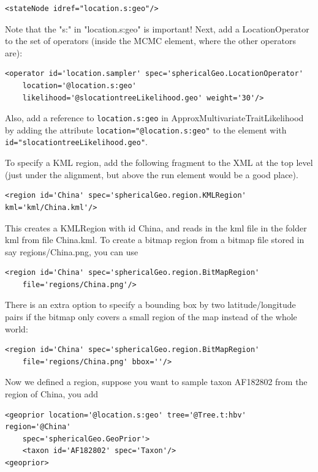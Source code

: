 \documentclass{article}
\begin{document}
\begin{verbatim}
<stateNode idref="location.s:geo"/>
\end{verbatim}

Note that the "s:" in "location.s:geo" is important!
Next, add a LocationOperator to the set of operators (inside the MCMC element, where the other operators are):

\begin{verbatim}
<operator id='location.sampler' spec='sphericalGeo.LocationOperator' 
    location='@location.s:geo' 
    likelihood='@slocationtreeLikelihood.geo' weight='30'/>
\end{verbatim}

Also, add a reference to {\tt location.s:geo} in ApproxMultivariateTraitLikelihood by adding the attribute {\tt location="@location.s:geo"} to the element with {\tt id="slocationtreeLikelihood.geo"}.

To specify a KML region, add the following fragment to the XML at the top level (just under the alignment, but above the run element would be a good place).

\begin{verbatim}
<region id='China' spec='sphericalGeo.region.KMLRegion' kml='kml/China.kml'/>
\end{verbatim}

This creates a KMLRegion with id China, and reads in the kml file in the folder kml from file China.kml. To create a bitmap region from a bitmap file stored in say regions/China.png, you can use

\begin{verbatim}
<region id='China' spec='sphericalGeo.region.BitMapRegion'
	file='regions/China.png'/>
\end{verbatim}
There is an extra option to specify a bounding box by two latitude/longitude pairs if the bitmap only covers a small region of the map instead of the whole world:
\begin{verbatim}
<region id='China' spec='sphericalGeo.region.BitMapRegion'
	file='regions/China.png' bbox=''/>
\end{verbatim}



Now we defined a region, suppose you want to sample taxon AF182802 from the region of China, you add

\begin{verbatim}
<geoprior location='@location.s:geo' tree='@Tree.t:hbv' region='@China'
	spec='sphericalGeo.GeoPrior'>
	<taxon id='AF182802' spec='Taxon'/> 
<geoprior>
\end{verbatim}
\end{document}
